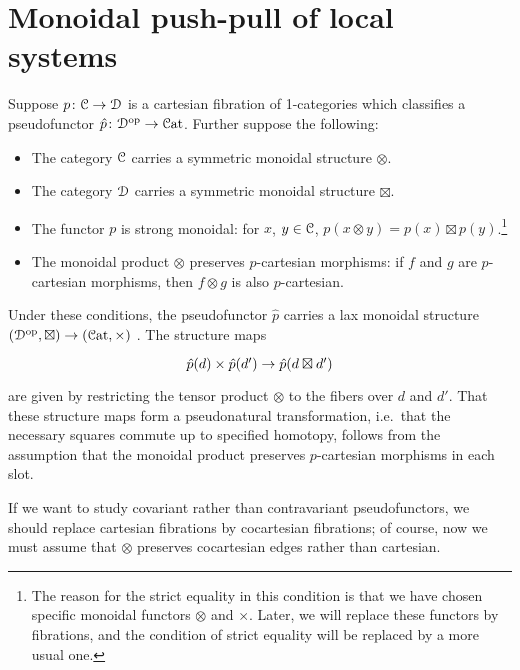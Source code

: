 \documentclass[main.tex]{subfiles}
\begin{document}
\section{Monoidal push-pull of local systems}
\label{sec:the_monoidal_construction}

Suppose $p\colon \mathcal{C} \to \mathcal{D}$ is a cartesian fibration of 1-categories which classifies a pseudofunctor $\hat{p}\colon \mathcal{D}^{\mathrm{op}} \to \mathcal{C}\mathrm{at}$. Further suppose the following:
\begin{itemize}
  \item The category $\mathcal{C}$ carries a symmetric monoidal structure $\otimes$.

  \item The category $\mathcal{D}$ carries a symmetric monoidal structure $\boxtimes$.

  \item The functor $p$ is strong monoidal: for $x$, $y \in \mathcal{C}$, $p(x \otimes y) = p(x) \boxtimes p(y)$.\footnote{The reason for the strict equality in this condition is that we have chosen specific monoidal functors $\otimes$ and $\times$. Later, we will replace these functors by fibrations, and the condition of strict equality will be replaced by a more usual one.}

  \item The monoidal product $\otimes$ preserves $p$-cartesian morphisms: if $f$ and $g$ are $p$-cartesian morphisms, then $f \otimes g$ is also $p$-cartesian.
\end{itemize}
Under these conditions, the pseudofunctor $\hat{p}$ carries a lax monoidal structure $(\mathcal{D}^{\mathrm{op}}, \boxtimes) \to (\mathcal{C}\mathrm{at}, \times)$ \cite{moeller2018monoidal}. The structure maps
\begin{equation*}
  \begin{tikzcd}
    \hat{p}(d) \times \hat{p}(d') \to \hat{p}(d \boxtimes d')
  \end{tikzcd}
\end{equation*}
are given by restricting the tensor product $\otimes$ to the fibers over $d$ and $d'$. That these structure maps form a pseudonatural transformation, i.e.\ that the necessary squares commute up to specified homotopy, follows from the assumption that the monoidal product preserves $p$-cartesian morphisms in each slot.

If we want to study covariant rather than contravariant pseudofunctors, we should replace cartesian fibrations by cocartesian fibrations; of course, now we must assume that $\otimes$ preserves cocartesian edges rather than cartesian.
\end{document}
